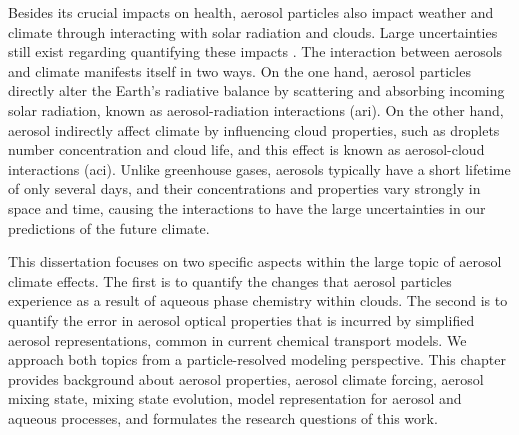 \documentclass[edeposit,fullpage]{uiucthesis2009}
\begin{document}
Besides its crucial impacts on health, aerosol particles also impact
weather and climate through interacting with solar radiation and
clouds. Large uncertainties still exist regarding quantifying these
impacts \citep{IPCC_CHAPTER7, seinfeld2016improving, fan2016review,
  bellouin2020bounding}. The interaction between aerosols and climate
manifests itself in two ways. On the one hand, aerosol particles
directly alter the Earth's radiative balance by scattering and
absorbing incoming solar radiation, known as aerosol-radiation
interactions (ari). On the other hand, aerosol indirectly affect
climate by influencing cloud properties, such as droplets number
concentration and cloud life, and this effect is known as
aerosol-cloud interactions (aci). Unlike greenhouse gases, aerosols
typically have a short lifetime of only several days, and their
concentrations and properties vary strongly in space and time, causing
the interactions to have the large uncertainties in our predictions of
the future climate.

This dissertation focuses on two specific aspects within the large
topic of aerosol climate effects. The first is to quantify the changes
that aerosol particles experience as a result of aqueous phase
chemistry within clouds. The second is to quantify the error in
aerosol optical properties that is incurred by simplified aerosol
representations, common in current chemical transport models. We
approach both topics from a particle-resolved modeling
perspective. This chapter provides background about aerosol
properties, aerosol climate forcing, aerosol mixing state, mixing
state evolution, model representation for aerosol and aqueous
processes, and formulates the research questions of this work.
\end{document}
